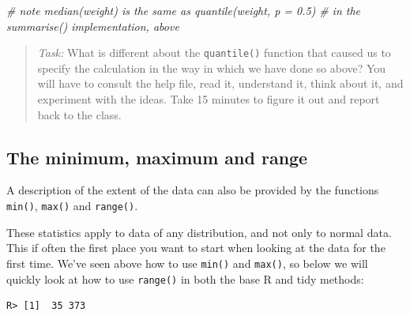\documentclass[english,10pt,a4paper,oneside]{book}
\newenvironment{Shaded}{\begin{snugshade}}{\end{snugshade}}
\newcommand{\CommentTok}[1]{\textcolor[rgb]{0.56,0.35,0.01}{\textit{#1}}}
\newcommand{\DataTypeTok}[1]{\textcolor[rgb]{0.13,0.29,0.53}{#1}}
\newcommand{\DecValTok}[1]{\textcolor[rgb]{0.00,0.00,0.81}{#1}}
\newcommand{\KeywordTok}[1]{\textcolor[rgb]{0.13,0.29,0.53}{\textbf{#1}}}
\newcommand{\NormalTok}[1]{#1}
\newcommand{\OperatorTok}[1]{\textcolor[rgb]{0.81,0.36,0.00}{\textbf{#1}}}
\newcommand{\StringTok}[1]{\textcolor[rgb]{0.31,0.60,0.02}{#1}}
\theoremstyle{definition}
\theoremstyle{definition}
\theoremstyle{definition}
\theoremstyle{remark}
\begin{document}
\begin{Shaded}
\begin{Highlighting}[]
\CommentTok{# note median(weight) is the same as quantile(weight, p = 0.5) }
\CommentTok{# in the summarise() implementation, above}
\end{Highlighting}
\end{Shaded}

\begin{quote}
\emph{Task:} What is different about the \texttt{quantile()} function
that caused us to specify the calculation in the way in which we have
done so above? You will have to consult the help file, read it,
understand it, think about it, and experiment with the ideas. Take 15
minutes to figure it out and report back to the class.
\end{quote}

\hypertarget{the-minimum-maximum-and-range}{%
\subsection{The minimum, maximum and
range}\label{the-minimum-maximum-and-range}}

A description of the extent of the data can also be provided by the
functions \texttt{min()}, \texttt{max()} and \texttt{range()}.

These statistics apply to data of any distribution, and not only to
normal data. This if often the first place you want to start when
looking at the data for the first time. We've seen above how to use
\texttt{min()} and \texttt{max()}, so below we will quickly look at how
to use \texttt{range()} in both the base R and tidy methods:

\begin{Shaded}
\end{Shaded}

\begin{verbatim}
R> [1]  35 373
\end{verbatim}

\begin{Shaded}
\end{Shaded}
\end{document}
